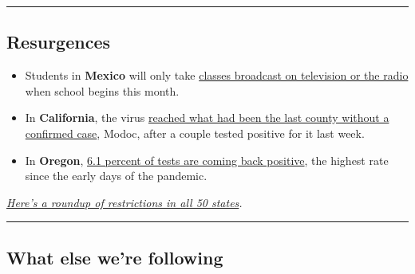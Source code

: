 \begin{center}\rule{0.5\linewidth}{\linethickness}\end{center}

\hypertarget{resurgences}{%
\subsection{Resurgences}\label{resurgences}}

\begin{itemize}
\item
  Students in \textbf{Mexico} will only take
  \href{https://www.nytimes.com/2020/08/04/world/coronavirus-cases.html\#link-18bf040e}{classes
  broadcast on television or the radio} when school begins this month.
\item
  In \textbf{California}, the virus
  \href{https://www.nytimes.com/2020/08/04/world/coronavirus-cases.html\#link-6031871d}{reached
  what had been the last county without a confirmed case}, Modoc, after
  a couple tested positive for it last week.
\item
  In \textbf{Oregon},
  \href{https://www.oregonlive.com/coronavirus/2020/08/coronavirus-in-oregon-positive-test-rate-climbs-to-61-highest-in-four-months.html?outputType=amp}{6.1
  percent of tests are coming back positive}, the highest rate since the
  early days of the pandemic.
\end{itemize}

\href{https://www.nytimes.com/interactive/2020/us/states-reopen-map-coronavirus.html}{\emph{Here's
a roundup of restrictions in all 50 states}}\emph{.}

\begin{center}\rule{0.5\linewidth}{\linethickness}\end{center}

\hypertarget{what-else-were-following}{%
\subsection{What else we're following}\label{what-else-were-following}}


